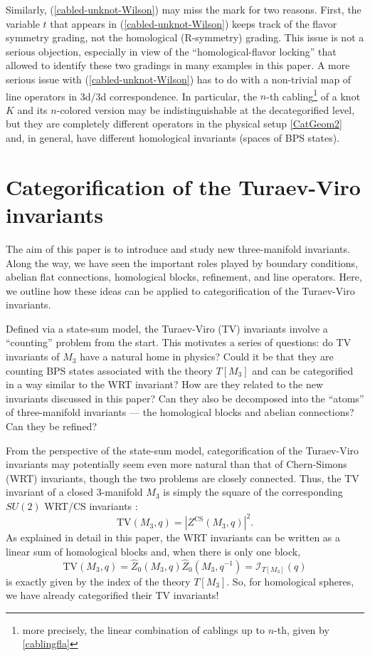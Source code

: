 \documentclass[hyper,letterpaper]{JHEP3}
\newcommand{\be}{\begin{equation}}
\newcommand{\ee}{\end{equation}}
\renewcommand{\hat}{\widehat}
\def\CI{{\mathcal I}}
\begin{document}
{Similarly, (\ref{cabled-unknot-Wilson}) may miss the mark for two reasons.
First, the variable $t$ that appears in (\ref{cabled-unknot-Wilson}) keeps track of the flavor symmetry grading,
not the homological (R-symmetry) grading. This issue is not a serious objection, especially in view of
the ``homological-flavor locking'' that allowed to identify these two gradings in many examples in this paper.
A more serious issue with (\ref{cabled-unknot-Wilson}) has to do with a non-trivial map of line operators in 3d/3d correspondence.
In particular, the $n$-th cabling\footnote{more precisely, the linear combination of cablings up to $n$-th, given by \eqref{cablingfla}}
of a knot $K$ and its $n$-colored version may be indistinguishable at the decategorified level, but they are completely
different operators in the physical setup \eqref{CatGeom2} and, in general, have different homological invariants (spaces of BPS states).



\section{Categorification of the Turaev-Viro invariants}
\label{sec:TV}

The aim of this paper is to introduce and study new three-manifold invariants. Along the way, we have seen the important roles played by boundary conditions, abelian flat connections, homological blocks, refinement, and line operators. Here, we outline how these ideas can be applied to categorification of the Turaev-Viro invariants.

Defined via a state-sum model, the Turaev-Viro (TV) invariants \cite{TURAEV1992865} involve a ``counting'' problem from the start.
This motivates a series of questions: do TV invariants of $M_3$ have a natural home in physics? Could it be that they are counting BPS states associated with the theory $T[M_3]$ and can be categorified in a way similar to the WRT invariant? How are they related to the new invariants discussed in this paper? Can they also be decomposed into the ``atoms'' of three-manifold invariants --- the homological blocks and abelian connections? Can they be refined?

{}From the perspective of the state-sum model, categorification of the Turaev-Viro invariants may potentially seem even more natural than that of Chern-Simons (WRT) invariants, though the two problems are closely connected. Thus, the TV invariant of a closed 3-manifold $M_3$ is simply the square of the corresponding $SU(2)$ WRT/CS invariants \cite{turaev1992shadow,walker1991witten,turaev1994quantum}:
\be
\mathrm{TV}(M_3, q) = \left|Z^{\text{CS}}(M_3, q)\right|^2.
\ee
As explained in detail in this paper, the WRT invariants can be written as a linear sum of homological blocks and,
when there is only one block,
\be
\mathrm{TV}(M_3, q) = \hat{Z}_0(M_3,q)\hat{Z}_0(M_3,q^{-1})=\CI_{T[M_3]}(q)
\ee
is exactly given by the index of the theory $T[M_3]$. So, for homological spheres, we have already categorified their TV invariants!

}
\end{document}
